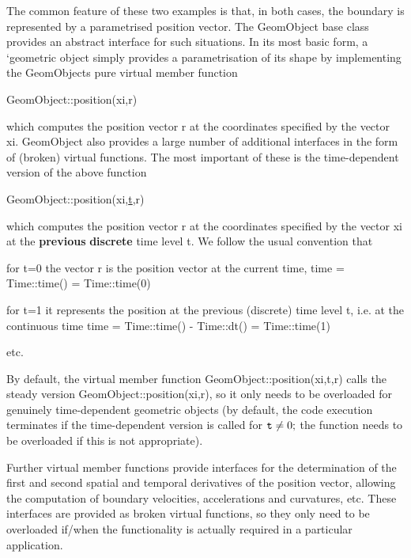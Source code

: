The common feature of these two examples is that, in both cases, the boundary is represented by a parametrised position vector. The {\ttfamily Geom\+Object} base class provides an abstract interface for such situations. In its most basic form, a `geometric object\textquotesingle{} simply provides a parametrisation of its shape by implementing the {\ttfamily Geom\+Object\textquotesingle{}s} pure virtual member function 
\begin{DoxyCode}
GeomObject::position(xi,r)
\end{DoxyCode}
 which computes the position vector {\ttfamily r} at the coordinates specified by the vector {\ttfamily xi}. {\ttfamily Geom\+Object} also provides a large number of additional interfaces in the form of (broken) virtual functions. The most important of these is the time-\/dependent version of the above function 
\begin{DoxyCode}
GeomObject::position(xi,\hyperlink{cfortran_8h_af6f0bd3dc13317f895c91323c25c2b8f}{t},r)
\end{DoxyCode}
 which computes the position vector {\ttfamily r} at the coordinates specified by the vector {\ttfamily xi} at the {\bfseries previous} {\bfseries discrete} time level {\ttfamily t}. We follow the usual convention that
\begin{DoxyItemize}
\item for {\ttfamily t=0} the vector {\ttfamily r} is the position vector at the current time, {\ttfamily  time = Time\+::time() = Time\+::time(0) }
\item for {\ttfamily t=1} it represents the position at the previous (discrete) time level {\ttfamily t}, i.\+e. at the continuous time {\ttfamily  time = Time\+::time() -\/ Time\+::dt() = Time\+::time(1) }
\item etc.
\end{DoxyItemize}By default, the virtual member function {\ttfamily Geom\+Object\+::position(xi,t,r)} calls the steady version {\ttfamily Geom\+Object\+::position(xi,r)}, so it only needs to be overloaded for genuinely time-\/dependent geometric objects (by default, the code execution terminates if the time-\/dependent version is called for $ {\tt t} \ne 0; $ the function needs to be overloaded if this is not appropriate).

Further virtual member functions provide interfaces for the determination of the first and second spatial and temporal derivatives of the position vector, allowing the computation of boundary velocities, accelerations and curvatures, etc. These interfaces are provided as broken virtual functions, so they only need to be overloaded if/when the functionality is actually required in a particular application.

